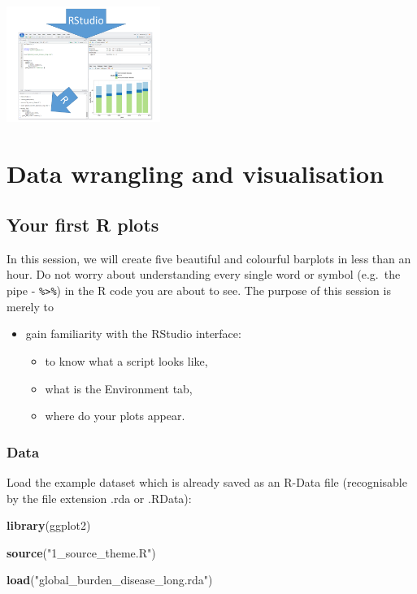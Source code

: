 \documentclass[12pt,]{krantz}
\makeatletter
\newenvironment{Shaded}{\begin{snugshade}}{\end{snugshade}}
\newcommand{\KeywordTok}[1]{\textcolor[rgb]{0.13,0.29,0.53}{\textbf{#1}}}
\newcommand{\NormalTok}[1]{#1}
\newcommand{\StringTok}[1]{\textcolor[rgb]{0.31,0.60,0.02}{#1}}
\providecommand{\tightlist}{%
  \setlength{\itemsep}{0pt}\setlength{\parskip}{0pt}}
\newenvironment{kframe}{%
\medskip{}
\setlength{\fboxsep}{.8em}
 \def\at@end@of@kframe{}%
 \ifinner\ifhmode%
  \def\at@end@of@kframe{\end{minipage}}%
  \begin{minipage}{\columnwidth}%
 \fi\fi%
 \def\FrameCommand##1{\hskip\@totalleftmargin \hskip-\fboxsep
 \colorbox{shadecolor}{##1}\hskip-\fboxsep
     \hskip-\linewidth \hskip-\@totalleftmargin \hskip\columnwidth}%
 \MakeFramed {\advance\hsize-\width
   \@totalleftmargin\z@ \linewidth\hsize
   \@setminipage}}%
 {\par\unskip\endMakeFramed%
 \at@end@of@kframe}
\renewenvironment{Shaded}{\begin{kframe}}{\end{kframe}}
\theoremstyle{definition}
\theoremstyle{definition}
\theoremstyle{definition}
\theoremstyle{remark}
\makeatother
\begin{document}
\includegraphics[width=5cm]{images/rstudio_vs_r}

\mainmatter

\hypertarget{part-data-wrangling-and-visualisation}{%
\part{Data wrangling and
visualisation}\label{part-data-wrangling-and-visualisation}}

\hypertarget{your-first-r-plots}{%
\chapter{Your first R plots}\label{your-first-r-plots}}

In this session, we will create five beautiful and colourful barplots in
less than an hour. Do not worry about understanding every single word or
symbol (e.g.~the pipe - \texttt{\%\textgreater{}\%}) in the R code you
are about to see. The purpose of this session is merely to

\begin{itemize}
\tightlist
\item
  gain familiarity with the RStudio interface:

  \begin{itemize}
  \tightlist
  \item
    to know what a script looks like,
  \item
    what is the Environment tab,
  \item
    where do your plots appear.
  \end{itemize}
\end{itemize}

\hypertarget{data}{%
\section{Data}\label{data}}

Load the example dataset which is already saved as an R-Data file
(recognisable by the file extension .rda or .RData):

\begin{Shaded}
\begin{Highlighting}[]
\KeywordTok{library}\NormalTok{(ggplot2)}

\KeywordTok{source}\NormalTok{(}\StringTok{"1_source_theme.R"}\NormalTok{)}

\KeywordTok{load}\NormalTok{(}\StringTok{"global_burden_disease_long.rda"}\NormalTok{)}
\end{Highlighting}
\end{Shaded}
\end{document}
